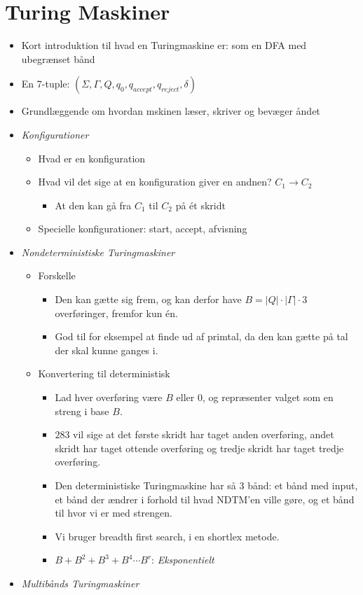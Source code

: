 \section*{Turing Maskiner}
\begin{itemize}
	\item Kort introduktion til hvad en Turingmaskine er: som en DFA med ubegrænset bånd
	\item En 7-tuple: $(\Sigma, \Gamma, Q, q_{0}, q_{accept}, q_{reject}, \delta)$
	\item Grundlæggende om hvordan mskinen læser, skriver og bevæger åndet
	\item \textit{Konfigurationer}
	      \begin{itemize}
		      \item Hvad er en konfiguration
		      \item Hvad vil det sige at en konfiguration giver en andnen? $C_{1} \rightarrow C_2$
		            \begin{itemize}
			            \item At den kan gå fra $C_{1}$ til $C_{2}$ på ét skridt
		            \end{itemize}
		      \item Specielle konfigurationer: start, accept, afvisning
	      \end{itemize}
	\item \textit{Nondeterministiske Turingmaskiner}
	      \begin{itemize}
		      \item Forskelle
		            \begin{itemize}
			            \item Den kan gætte sig frem, og kan derfor have $B = |Q| \cdot |\Gamma| \cdot 3$ overføringer, fremfor kun én.
			            \item God til for eksempel at finde ud af primtal, da den kan gætte på tal der skal kunne ganges i.
		            \end{itemize}
		      \item Konvertering til deterministisk
		            \begin{itemize}
			            \item Lad hver overføring være $B$ eller $0$, og repræsenter valget som en streng i base $B$.
			            \item $283$ vil sige at det første skridt har taget anden overføring, andet skridt har taget ottende overføring og tredje skridt har taget tredje overføring.
			            \item Den deterministiske Turingmaskine har så 3 bånd: et bånd med input, et bånd der ændrer i forhold til hvad NDTM'en ville gøre, og et bånd til hvor vi er med strengen.
			            \item Vi bruger breadth first search, i en shortlex metode.
			            \item $B + B^2 + B^{3} + B^{4} \cdots B^{r}$: \textit{Eksponentielt}
		            \end{itemize}
	      \end{itemize}
	\item \textit{Multibånds Turingmaskiner}
\end{itemize}

